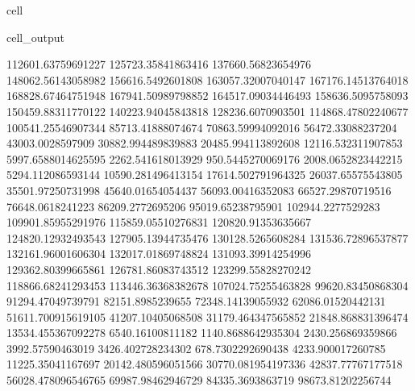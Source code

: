 \documentclass[letterpaper,10pt,english]{jupyterBook}
\begin{document}
\begin{sphinxuseclass}{cell}
\begin{sphinxVerbatimOutput}
\begin{sphinxuseclass}{cell_output}
\begin{sphinxVerbatim}[commandchars=\\\{\}]
112601.63759691227  125723.35841863416  137660.56823654976  148062.56143058982  156616.5492601808  163057.32007040147  167176.14513764018  168828.67464751948  167941.50989798852  164517.09034446493  158636.5095758093  150459.88311770122  140223.94045843818  128236.6070903501  114868.47802240677  100541.25546907344  85713.41888074674  70863.59994092016  56472.33088237204  43003.0028597909  30882.994489839883  20485.994113892608  12116.532311907853  5997.6588014625595  2262.541618013929  950.5445270069176  2008.0652823442215  5294.112086593144  10590.281496413154  17614.502791964325  26037.65575543805  35501.97250731998  45640.01654054437  56093.00416352083  66527.29870719516  76648.0618241223  86209.2772695206  95019.65238795901  102944.2277529283  109901.85955291976  115859.05510276831  120820.91353635667  124820.12932493543  127905.13944735476  130128.5265608284  131536.72896537877  132161.96001606304  132017.01869748824  131093.39914254996  129362.80399665861  126781.86083743512  123299.55828270242  118866.68241293453  113446.36368382678  107024.75255463828  99620.83450868304  91294.47049739791  82151.8985239655  72348.14139055932  62086.01520442131  51611.700915619105  41207.10405068508  31179.464347565852  21848.868831396474  13534.455367092278  6540.16100811182  1140.8688642935304  \PYGZhy{}2430.256869359866  \PYGZhy{}3992.57590463019  \PYGZhy{}3426.402728234302  \PYGZhy{}678.7302292690438  4233.900017260785  11225.35041167697  20142.480596051566  30770.081954197336  42837.77767177518  56028.478096546765  69987.98462946729  84335.3693863719  98673.81202256744  

\end{sphinxVerbatim}
\end{sphinxuseclass}
\end{sphinxVerbatimOutput}
\end{sphinxuseclass}
\end{document}
